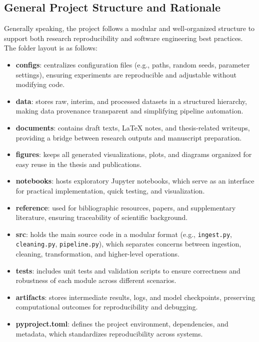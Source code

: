 \subsection{General Project Structure and Rationale}

Generally speaking, the project follows a modular and well-organized structure to support both 
research reproducibility and software engineering best practices.
The folder layout is as follows:

\begin{itemize}
    \item \textbf{configs}: centralizes configuration files (e.g., paths, random seeds, parameter settings), ensuring experiments are reproducible and adjustable without modifying code.
    \item \textbf{data}: stores raw, interim, and processed datasets in a structured hierarchy, making data provenance transparent and simplifying pipeline automation.
    \item \textbf{documents}: contains draft texts, LaTeX notes, and thesis-related writeups, providing a bridge between research outputs and manuscript preparation.
    \item \textbf{figures}: keeps all generated visualizations, plots, and diagrams organized for easy reuse in the thesis and publications.
    \item \textbf{notebooks}: hosts exploratory Jupyter notebooks, which serve as an interface for practical implementation, quick testing, and visualization.
    \item \textbf{reference}: used for bibliographic resources, papers, and supplementary literature, ensuring traceability of scientific background.
    \item \textbf{src}: holds the main source code in a modular format (e.g., \texttt{ingest.py}, \texttt{cleaning.py}, \texttt{pipeline.py}), which separates concerns between ingestion, cleaning, transformation, and higher-level operations.
    \item \textbf{tests}: includes unit tests and validation scripts to ensure correctness and robustness of each module across different scenarios.
    \item \textbf{artifacts}: stores intermediate results, logs, and model checkpoints, preserving computational outcomes for reproducibility and debugging.
    \item \textbf{pyproject.toml}: defines the project environment, dependencies, and metadata, which standardizes reproducibility across systems.
\end{itemize}

